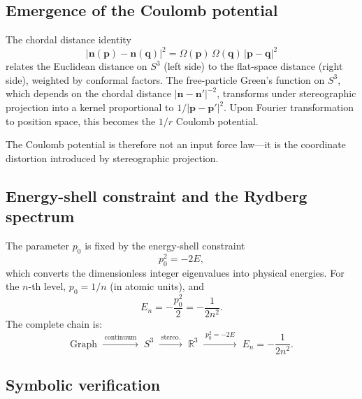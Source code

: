 \documentclass[aps,pra,twocolumn,superscriptaddress,longbibliography]{revtex4-2}
\begin{document}
\subsection{Emergence of the Coulomb potential}

The chordal distance identity
\begin{equation}
|\mathbf{n}(\mathbf{p}) - \mathbf{n}(\mathbf{q})|^2
= \Omega(\mathbf{p})\, \Omega(\mathbf{q})\, |\mathbf{p} - \mathbf{q}|^2
\label{eq:chordal}
\end{equation}
relates the Euclidean distance on $S^3$ (left side) to the flat-space
distance (right side), weighted by conformal factors.  The free-particle
Green's function on $S^3$, which depends on the chordal distance
$|\mathbf{n} - \mathbf{n}'|^{-2}$, transforms under stereographic
projection into a kernel proportional to
$1/|\mathbf{p} - \mathbf{p}'|^2$.  Upon Fourier transformation to
position space, this becomes the $1/r$ Coulomb potential.

The Coulomb potential is therefore not an input force law---it is the
coordinate distortion introduced by stereographic projection.

\subsection{Energy-shell constraint and the Rydberg spectrum}

The parameter $p_0$ is fixed by the energy-shell constraint
\begin{equation}
p_0^2 = -2E,
\label{eq:energy_shell}
\end{equation}
which converts the dimensionless integer eigenvalues into physical
energies.  For the $n$-th level, $p_0 = 1/n$ (in atomic units), and
\begin{equation}
E_n = -\frac{p_0^2}{2} = -\frac{1}{2n^2}.
\label{eq:rydberg}
\end{equation}
The complete chain is:
\begin{equation}
\text{Graph} \;\xrightarrow{\;\text{continuum}\;}\; S^3
\;\xrightarrow{\;\text{stereo.}\;}\; \mathbb{R}^3
\;\xrightarrow{\;p_0^2 = -2E\;}\; E_n = -\frac{1}{2n^2}.
\label{eq:chain}
\end{equation}

\subsection{Symbolic verification}
\end{document}

